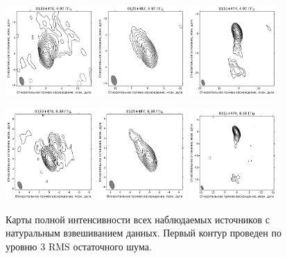 \begin{figure}
  \includegraphics[width=0.3\textwidth]{0133+476_C.pdf}
  \includegraphics[width=0.3\textwidth]{0125+487_C.pdf}
  \includegraphics[width=0.3\textwidth]{0151+474_C.pdf}


  \includegraphics[width=0.3\textwidth]{0133+476_X.pdf}
  \includegraphics[width=0.3\textwidth]{0125+487_X.pdf}
  \includegraphics[width=0.3\textwidth]{0151+474_X.pdf}

  \caption{Карты полной интенсивности всех наблюдаемых источников с натуральным взвешиванием данных.
Первый контур проведен по уровню 3 RMS остаточного шума.}
  \label{fig:maps}
\end{figure}

